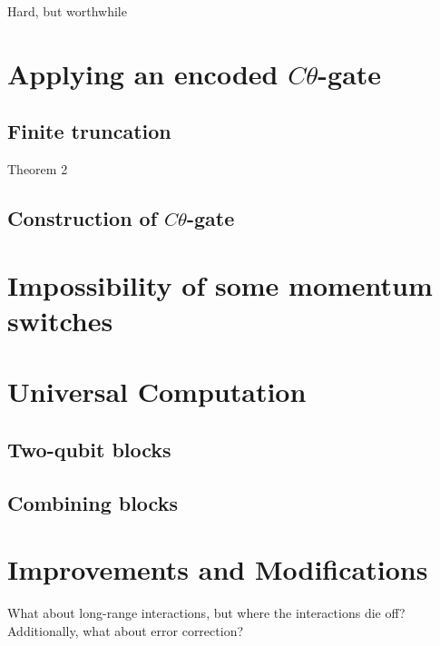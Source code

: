 % 

Hard, but worthwhile






\section{Applying an encoded $C\theta$-gate}

\subsection{Finite truncation}

Theorem 2

\subsection{Construction of $C\theta$-gate}

\section{Impossibility of some momentum switches}

\section{Universal Computation}
\subsection{Two-qubit blocks}
\subsection{Combining blocks}


\section{Improvements and Modifications}

What about long-range interactions, but where the interactions die off?
Additionally, what about error correction?